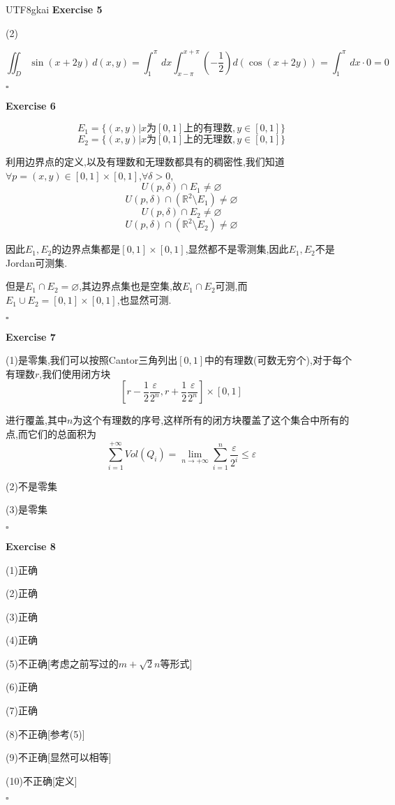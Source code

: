 \documentclass[11pt,hyperref,a4paper,UTF8]{ctexart}
\newenvironment{exercise}[1]{%
{\textbf{Exercise #1} \\ 
    }
}{
  \hfill $\square$ 
  \par\bigskip 
}
\newcommand{\RR}{\mathbb{R}}
\newcommand{\parameter}[1]{\left(#1\right)}
\begin{document}
\begin{CJK}{UTF8}{gkai}
\begin{exercise}{5}
    (2)

    \[\iint_D \sin(x + 2y)\, d(x,y) = \int_{1}^{\pi}\, dx \int_{x - \pi}^{x + \pi} \parameter{-\frac{1}{2}} d(\cos(x+ 2y)) = \int_{1}^{\pi}\, dx \cdot 0 = 0\]
\end{exercise}

\begin{exercise}{6}
    \[E_1 = \{(x,y)| x\text{为}[0,1]\text{上的有理数},y \in [0,1]\}\]
    \[E_2 = \{(x,y)| x\text{为}[0,1]\text{上的无理数},y \in [0,1]\}\]

    利用边界点的定义,以及有理数和无理数都具有的稠密性,我们知道$\forall p = (x,y) \in [0,1]\times [0,1]$,$\forall \delta > 0$,
    \[U(p,\delta) \cap  E_1 \neq \varnothing\]
    \[U(p,\delta) \cap  (\RR^2 \setminus E_1) \neq \varnothing\]
    \[U(p,\delta) \cap  E_2 \neq \varnothing\]
    \[U(p,\delta) \cap  (\RR^2 \setminus E_2) \neq \varnothing\]

    因此$E_1,E_2$的边界点集都是$[0,1]\times[0,1]$,显然都不是零测集,因此$E_1,E_2$不是Jordan可测集.

    但是$E_1 \cap E_2 = \varnothing$,其边界点集也是空集,故$E_1 \cap E_2$可测,而$E_1 \cup E_2 = [0,1]\times[0,1]$,也显然可测.
\end{exercise}

\begin{exercise}{7}
    (1)是零集,我们可以按照Cantor三角列出$[0,1]$中的有理数(可数无穷个),对于每个有理数$r$,我们使用闭方块
    \[[r - \frac{1}{2} \frac{\varepsilon}{2^n}, r + \frac{1}{2} \frac{\varepsilon}{2^n}] \times [0,1]\]

    进行覆盖,其中$n$为这个有理数的序号,这样所有的闭方块覆盖了这个集合中所有的点,而它们的总面积为
    \[\sum_{i = 1}^{+\infty} Vol(Q_i) = \lim_{n \to +\infty} \sum_{i = 1}^{n} \frac{\varepsilon}{2^i} \leq \varepsilon\]

    (2)不是零集

    (3)是零集
\end{exercise}

\begin{exercise}{8}
    (1)正确

    (2)正确

    (3)正确

    (4)正确

    (5)不正确[考虑之前写过的$m + \sqrt{2} n$等形式]

    (6)正确

    (7)正确

    (8)不正确[参考(5)]

    (9)不正确[显然可以相等]

    (10)不正确[定义]
\end{exercise}

\end{CJK}
\end{document}
